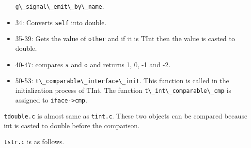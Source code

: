 \begin{itemize}
  \passthrough{\lstinline!g\_signal\_emit\_by\_name!}.
\item
  34: Converts \passthrough{\lstinline!self!} into double.
\item
  35-39: Gets the value of \passthrough{\lstinline!other!} and if it is
  TInt then the value is casted to double.
\item
  40-47: compares \passthrough{\lstinline!s!} and
  \passthrough{\lstinline!o!} and returns 1, 0, -1 and -2.
\item
  50-53: \passthrough{\lstinline!t\_comparable\_interface\_init!}. This
  function is called in the initialization process of TInt. The function
  \passthrough{\lstinline!t\_int\_comparable\_cmp!} is assigned to
  \passthrough{\lstinline!iface->cmp!}.
\end{itemize}

\passthrough{\lstinline!tdouble.c!} is almost same as
\passthrough{\lstinline!tint.c!}. These two objects can be compared
because int is casted to double before the comparison.

\passthrough{\lstinline!tstr.c!} is as follows.

